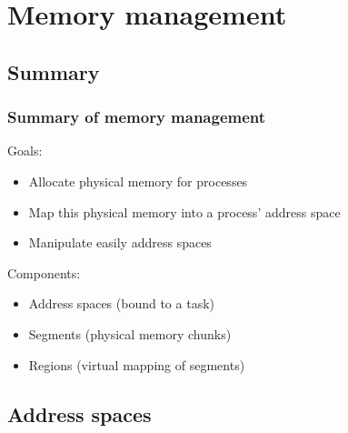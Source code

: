 %
%

\section{Memory management}

%
%

\subsection{Summary}


\begin{frame}
  \frametitle{Summary of memory management}

  Goals:

  \nl

  \begin{itemize}
  \item Allocate physical memory for processes
  \item Map this physical memory into a process' address space
  \item Manipulate easily address spaces
  \end{itemize}

  \nl

  Components:

  \nl

  \begin{itemize}
  \item Address spaces (bound to a task)
  \item Segments (physical memory chunks)
  \item Regions (virtual mapping of segments)
  \end{itemize}

\end{frame}

%
%

\subsection{Address spaces}


